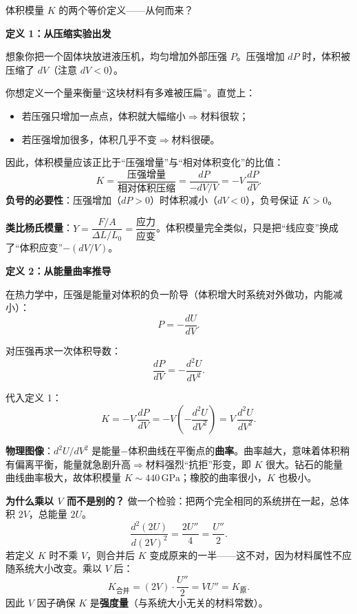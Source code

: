 \begin{modelbox}{体积模量 $K$ 的两个等价定义——从何而来？}

\textbf{定义 1：从压缩实验出发}

想象你把一个固体块放进液压机，均匀增加外部压强 $P$。压强增加 $dP$ 时，体积被压缩了 $dV$（注意 $dV<0$）。

你想定义一个量来衡量``这块材料有多难被压扁''。直觉上：
\begin{itemize}[nosep]
  \item 若压强只增加一点点，体积就大幅缩小$\Rightarrow$材料很软；
  \item 若压强增加很多，体积几乎不变$\Rightarrow$材料很硬。
\end{itemize}

因此，体积模量应该正比于``压强增量''与``相对体积变化''的比值：
\[
  K = \frac{\text{压强增量}}{\text{相对体积压缩}} = \frac{dP}{-dV/V} = -V\,\frac{dP}{dV}.
\]
\textbf{负号的必要性}：压强增加（$dP>0$）时体积减小（$dV<0$），负号保证 $K>0$。

\textbf{类比杨氏模量}：$Y = \dfrac{F/A}{\Delta L/L_0} = \dfrac{\text{应力}}{\text{应变}}$。体积模量完全类似，只是把``线应变''换成了``体积应变''$-(dV/V)$。

\vspace{0.5em}
\textbf{定义 2：从能量曲率推导}

在热力学中，压强是能量对体积的负一阶导（体积增大时系统对外做功，内能减小）：
\[
  P = -\frac{dU}{dV}.
\]

对压强再求一次体积导数：
\[
  \frac{dP}{dV} = -\frac{d^2U}{dV^2}.
\]

代入定义 1：
\[
  K = -V\,\frac{dP}{dV} = -V\left(-\frac{d^2U}{dV^2}\right) = \boxed{V\,\frac{d^2U}{dV^2}}.
\]

\textbf{物理图像}：$d^2U/dV^2$ 是能量$-$体积曲线在平衡点的\textbf{曲率}。曲率越大，意味着体积稍有偏离平衡，能量就急剧升高$\Rightarrow$材料强烈``抗拒''形变，即 $K$ 很大。钻石的能量曲线曲率极大，故体积模量 $K\sim 440\,\text{GPa}$；橡胶的曲率很小，$K$ 也极小。

\textbf{为什么乘以 $V$ 而不是别的？} 做一个检验：把两个完全相同的系统拼在一起，总体积 $2V$，总能量 $2U$。
\[
  \frac{d^2(2U)}{d(2V)^2} = \frac{2U''}{4} = \frac{U''}{2}.
\]
若定义 $K$ 时不乘 $V$，则合并后 $K$ 变成原来的一半——这不对，因为材料属性不应随系统大小改变。乘以 $V$ 后：
\[
  K_{\text{合并}} = (2V)\cdot\frac{U''}{2} = VU'' = K_{\text{原}}.
\]
因此 $V$ 因子确保 $K$ 是\textbf{强度量}（与系统大小无关的材料常数）。
\end{modelbox}

